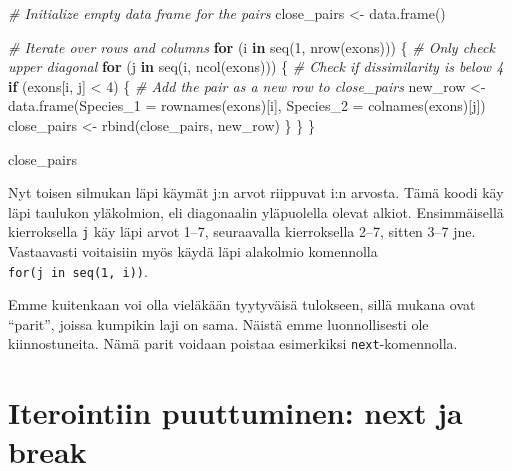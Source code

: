 \documentclass[
]{book}
\newenvironment{Shaded}{\begin{snugshade}}{\end{snugshade}}
\newcommand{\AttributeTok}[1]{\textcolor[rgb]{0.77,0.63,0.00}{#1}}
\newcommand{\CommentTok}[1]{\textcolor[rgb]{0.56,0.35,0.01}{\textit{#1}}}
\newcommand{\ControlFlowTok}[1]{\textcolor[rgb]{0.13,0.29,0.53}{\textbf{#1}}}
\newcommand{\DecValTok}[1]{\textcolor[rgb]{0.00,0.00,0.81}{#1}}
\newcommand{\FunctionTok}[1]{\textcolor[rgb]{0.00,0.00,0.00}{#1}}
\newcommand{\NormalTok}[1]{#1}
\newcommand{\OtherTok}[1]{\textcolor[rgb]{0.56,0.35,0.01}{#1}}
\newcommand{\SpecialCharTok}[1]{\textcolor[rgb]{0.00,0.00,0.00}{#1}}
\begin{document}
\begin{Shaded}
\begin{Highlighting}[]
\CommentTok{\# Initialize empty data frame for the pairs}
\NormalTok{close\_pairs }\OtherTok{\textless{}{-}} \FunctionTok{data.frame}\NormalTok{()}

\CommentTok{\# Iterate over rows and columns}
\ControlFlowTok{for}\NormalTok{ (i }\ControlFlowTok{in} \FunctionTok{seq}\NormalTok{(}\DecValTok{1}\NormalTok{, }\FunctionTok{nrow}\NormalTok{(exons))) \{}
  \CommentTok{\# Only check upper diagonal}
  \ControlFlowTok{for}\NormalTok{ (j }\ControlFlowTok{in} \FunctionTok{seq}\NormalTok{(i, }\FunctionTok{ncol}\NormalTok{(exons))) \{}
    \CommentTok{\# Check if dissimilarity is below 4}
    \ControlFlowTok{if}\NormalTok{ (exons[i, j] }\SpecialCharTok{\textless{}} \DecValTok{4}\NormalTok{) \{}
      \CommentTok{\# Add the pair as a new row to close\_pairs}
\NormalTok{      new\_row }\OtherTok{\textless{}{-}} \FunctionTok{data.frame}\NormalTok{(}\AttributeTok{Species\_1 =} \FunctionTok{rownames}\NormalTok{(exons)[i],}
                            \AttributeTok{Species\_2 =} \FunctionTok{colnames}\NormalTok{(exons)[j])}
\NormalTok{      close\_pairs }\OtherTok{\textless{}{-}} \FunctionTok{rbind}\NormalTok{(close\_pairs,}
\NormalTok{                           new\_row)}
\NormalTok{    \}}
\NormalTok{  \}}
\NormalTok{\}}

\NormalTok{close\_pairs}
\end{Highlighting}
\end{Shaded}

Nyt toisen silmukan läpi käymät j:n arvot riippuvat i:n arvosta. Tämä koodi käy läpi taulukon yläkolmion, eli diagonaalin yläpuolella olevat alkiot. Ensimmäisellä kierroksella \texttt{j} käy läpi arvot 1--7, seuraavalla kierroksella 2--7, sitten 3--7 jne. Vastaavasti voitaisiin myös käydä läpi alakolmio komennolla \texttt{for(j\ in\ seq(1,\ i))}.

Emme kuitenkaan voi olla vieläkään tyytyväisä tulokseen, sillä mukana ovat ``parit'', joissa kumpikin laji on sama. Näistä emme luonnollisesti ole kiinnostuneita. Nämä parit voidaan poistaa esimerkiksi \texttt{next}-komennolla.

\hypertarget{iterointiin-puuttuminen-next-ja-break}{%
\section{Iterointiin puuttuminen: next ja break}\label{iterointiin-puuttuminen-next-ja-break}}
\end{document}
